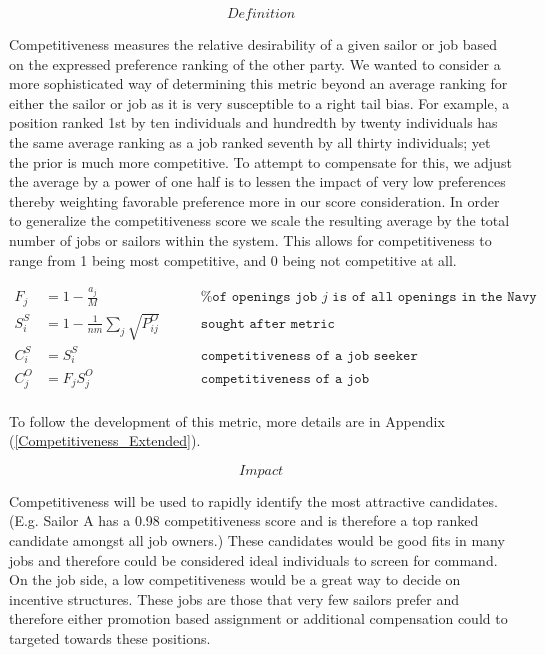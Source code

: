 \[\textit{Definition}\]

Competitiveness measures the relative desirability of a given sailor or job based on the expressed preference ranking of the other party. We wanted to consider a more sophisticated way of determining this metric beyond an average ranking for either the sailor or job as it is very susceptible to a right tail bias.  For example, a position ranked 1st by ten individuals and hundredth by twenty individuals has the same average ranking as a job ranked seventh by all thirty individuals; yet the prior is much more competitive. To attempt to compensate for this, we adjust the average by a power of one half is to lessen the impact of very low preferences thereby weighting favorable preference more in our score consideration. 
 In order to generalize the competitiveness score we scale the resulting average by the total number of jobs or sailors within the system. This allows for competitiveness to range from 1 being most competitive, and 0 being not competitive at all.

\begin{align}
F_j &= 1 - \frac{a_j}{M} \quad&&\texttt{ \% of openings job $j$ is of all openings in the Navy} \\ 
S^S_i &= 1 - \frac{1}{nm} \sum_j \sqrt{P_{ij}^O} \quad &&\texttt{ sought after metric} \\
C_i^S &= S^S_i \quad &&\texttt{ competitiveness of a job seeker} \\
C_j^O &= F_j S^O_j \quad  &&\texttt{ competitiveness of a job} \\
\end{align}

To follow the development of this metric, more details are in Appendix (\ref{Competitiveness_Extended}).

\[\textit{Impact}\]

Competitiveness will be used to rapidly identify the most attractive candidates. (E.g. Sailor A has a 0.98 competitiveness score and is therefore a top ranked candidate amongst all job owners.) These candidates would be good fits in many jobs and therefore could be considered ideal individuals to screen for command. On the job side, a low competitiveness would be a great way to decide on incentive structures. These jobs are those that very few sailors prefer and therefore either promotion based assignment or additional compensation could to targeted towards these positions. 